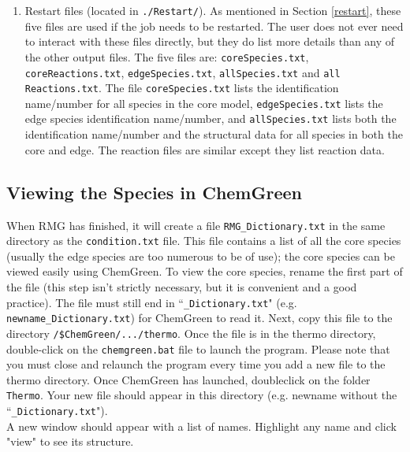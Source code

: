 \documentclass[12pt,letterpaper]{article}
\begin{document}
\begin{enumerate}
\item Restart files (located in \texttt{./Restart/}).  As mentioned in Section \ref{restart}, these five files are used if the job needs to be restarted.  The
user does not ever need to interact with these files directly, but they do
list more details than any of the other output files. The five files are:
\texttt{coreSpecies.txt}, \texttt{coreReactions.txt}, \texttt{edgeSpecies.txt}, \texttt{allSpecies.txt} and \texttt{all
Reactions.txt}. The file \texttt{coreSpecies.txt} lists the identification name/number
for all species in the core model, \texttt{edgeSpecies.txt} lists the edge species
identification name/number, and \texttt{allSpecies.txt} lists both the identification
name/number and the structural data for all species in both the core and edge. The reaction files are similar except they list reaction data.\\

\end{enumerate}

\subsection{Viewing the Species in ChemGreen}\label{view chemgreen}

When RMG has finished, it will create a file \texttt{RMG\_Dictionary.txt} in the same
directory as the \texttt{condition.txt} file. This file contains a list of all the core species
(usually the edge species are too numerous to be of use); the core species can
be viewed easily using ChemGreen. To view the core species, rename the first part of the file (this step isn't strictly necessary, but it is
convenient and a good practice). The file must still end in ``\texttt{\_Dictionary.txt}"
(e.g. \texttt{newname\_Dictionary.txt}) for ChemGreen to read it. Next, copy this file
to the directory \texttt{/\$ChemGreen/.../thermo}. Once the file is in the thermo directory,
double-click on the \texttt{chemgreen.bat} file to launch the program. Please
note that you must close and relaunch the program every time you add a
new file to the thermo directory. Once ChemGreen has launched, doubleclick
on the folder \texttt{Thermo}. Your new file should appear in this directory (e.g. newname without the ``\texttt{\_Dictionary.txt}").\\

A new window should appear with a list of names. Highlight any name
and click "view" to see its structure.
\end{document}
